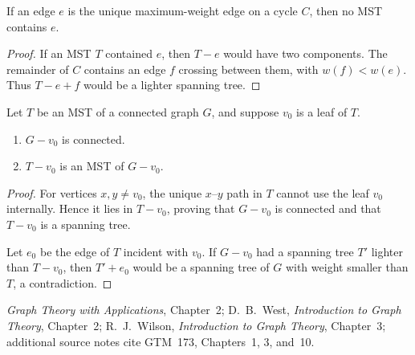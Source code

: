 \begin{notetheorem}
If an edge $e$ is the unique maximum-weight edge on a cycle $C$, then no MST contains $e$.
\end{notetheorem}
\begin{proof}
If an MST $T$ contained $e$, then $T-e$ would have two components.  The remainder of $C$ contains an edge $f$ crossing between them, with $w(f)<w(e)$.  Thus $T-e+f$ would be a lighter spanning tree.
\end{proof}
\begin{notetheorem}
Let $T$ be an MST of a connected graph $G$, and suppose $v_0$ is a leaf of $T$.
\begin{enumerate}
  \item $G-v_0$ is connected.
  \item $T-v_0$ is an MST of $G-v_0$.
\end{enumerate}
\end{notetheorem}
\begin{proof}
For vertices $x,y\ne v_0$, the unique $x$--$y$ path in $T$ cannot use the leaf $v_0$ internally.  Hence it lies in $T-v_0$, proving that $G-v_0$ is connected and that $T-v_0$ is a spanning tree.

Let $e_0$ be the edge of $T$ incident with $v_0$.  If $G-v_0$ had a spanning tree $T'$ lighter than $T-v_0$, then $T'+e_0$ would be a spanning tree of $G$ with weight smaller than $T$, a contradiction.
\end{proof}
\begin{noteremark}
\emph{Graph Theory with Applications}, Chapter~2; D.~B.~West, \emph{Introduction to Graph Theory}, Chapter~2; R.~J.~Wilson, \emph{Introduction to Graph Theory}, Chapter~3; additional source notes cite GTM~173, Chapters~1, 3, and~10.
\end{noteremark}
